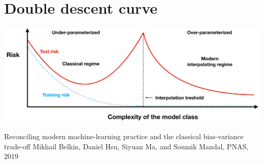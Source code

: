 \documentclass[10pt]{article}
\begin{document}
\section*{Double descent curve}
\begin{center}
\includegraphics[max width=\textwidth]{2023_12_30_442f876157646883c2c9g-31}
\end{center}

Reconciling modern machine-learning practice and the classical bias-variance trade-off Mikhail Belkin, Daniel Hsu, Siyuan Ma, and Soumik Mandal, PNAS, 2019
\end{document}

